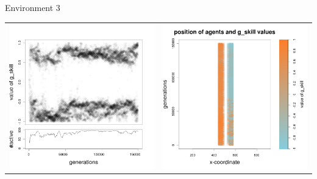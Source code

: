 \documentclass[8pt, handout=show,notes=show]{beamer}
\begin{document}
\begin{frame}{Environment 3}
\begin{table}[H]
\begin{tabular}{cc}
\newline
\includegraphics[width=\imgSize]{../images/5StaticEnv/Gplot8_staticEnv3}&\includegraphics[width=\imgSize]{../images/5StaticEnv/Gplot8Static_staticEnv3}\\

\end{tabular}

\end{table}
\end{frame}
\end{document}
